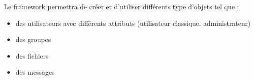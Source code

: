 Le framework permettra de créer et d'utiliser différents type d'objets tel que :

\begin{itemize}
\item{des utilisateurs avec différents attributs (utilisateur classique, administrateur)}
\item{des groupes}
\item{des fichiers}
\item{des messages}
\end{itemize}
